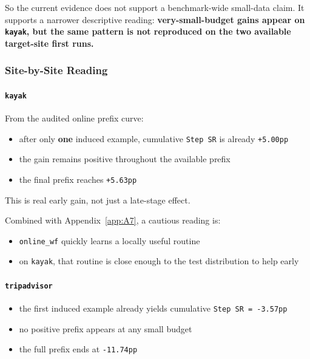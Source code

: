 So the current evidence does not support a benchmark-wide small-data
claim. It supports a narrower descriptive reading:
\textbf{very-small-budget gains appear on \texttt{kayak}, but the same
pattern is not reproduced on the two available target-site first
runs.}

\subsubsection{Site-by-Site Reading}

\paragraph{\texorpdfstring{\texttt{kayak}}{kayak}}

From the audited online prefix curve:

\begin{itemize}
\tightlist
\item
  after only \textbf{one} induced example, cumulative \texttt{Step\ SR}
  is already \texttt{+5.00pp}
\item
  the gain remains positive throughout the available prefix
\item
  the final prefix reaches \texttt{+5.63pp}
\end{itemize}

This is real early gain, not just a late-stage effect.

Combined with Appendix~\ref{app:A7},
a cautious reading is:

\begin{itemize}
\tightlist
\item
  \texttt{online\_wf} quickly learns a locally useful routine
\item
  on \texttt{kayak}, that routine is close enough to the test
  distribution to help early
\end{itemize}

\paragraph{\texorpdfstring{\texttt{tripadvisor}}{tripadvisor}}

\begin{itemize}
\tightlist
\item
  the first induced example already yields cumulative
  \texttt{Step\ SR\ =\ -3.57pp}
\item
  no positive prefix appears at any small budget
\item
  the full prefix ends at \texttt{-11.74pp}
\end{itemize}

